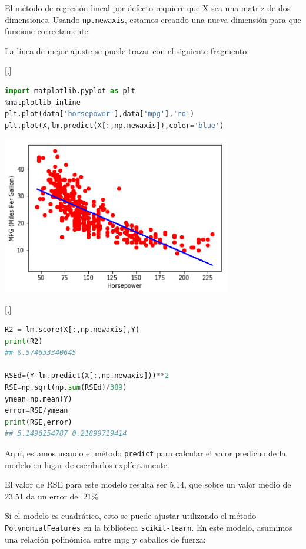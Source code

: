El método de regresión lineal por defecto requiere que X sea una matriz de dos
dimensiones. Usando \texttt{np.newaxis}, estamos creando una nueva dimensión para que
funcione correctamente.

La línea de mejor ajuste se puede trazar con el siguiente fragmento:

[,]{}
\begin{lstlisting}[language=Python]
import matplotlib.pyplot as plt
%matplotlib inline
plt.plot(data['horsepower'],data['mpg'],'ro')
plt.plot(X,lm.predict(X[:,np.newaxis]),color='blue')
\end{lstlisting}



\begin{center}
 \includegraphics[width=10cm,keepaspectratio=true]{./images/hpLR.png}
\end{center}
[,]{}
\begin{lstlisting}[language=Python]
R2 = lm.score(X[:,np.newaxis],Y)
print(R2)
## 0.574653340645

RSEd=(Y-lm.predict(X[:,np.newaxis]))**2
RSE=np.sqrt(np.sum(RSEd)/389)
ymean=np.mean(Y)
error=RSE/ymean
print(RSE,error)
## 5.1496254787 0.21899719414
\end{lstlisting}


Aquí, estamos usando el método \texttt{predict} para calcular el valor predicho de la
modelo en lugar de escribirlos explícitamente.

El valor de RSE para este modelo resulta ser 5.14, que sobre un valor medio de 23.51 da un error del 21\%



Si el modelo es cuadrático, esto se puede ajustar utilizando el método \texttt{PolynomialFeatures} en la biblioteca \texttt{scikit-learn}. En este modelo, asumimos una relación polinómica entre mpg
y caballos de fuerza:

